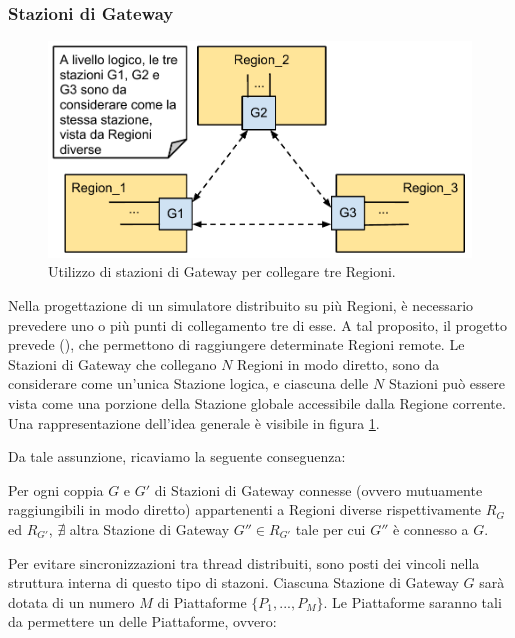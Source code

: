 	
	\subsubsection{Stazioni di Gateway}\label{sec:gateway_stations}
	
	\begin{figure}[htbp]
		\begin{center}
			\includegraphics[width=\textwidth,keepaspectratio]{imgs/gateway_stations.pdf}
			\caption{\footnotesize{Utilizzo di stazioni di Gateway per collegare tre Regioni.}}
			\label{fig:gateway_stations}
		\end{center}
	\end{figure}

	Nella progettazione di un simulatore distribuito su più Regioni, è necessario prevedere uno o più punti di collegamento tre di esse. A tal proposito, il progetto prevede  (), che permettono di raggiungere determinate Regioni remote. Le Stazioni di Gateway che collegano $N$ Regioni in modo diretto, sono da considerare come un'unica Stazione logica, e ciascuna delle $N$ Stazioni può essere vista come una porzione della Stazione globale accessibile dalla Regione corrente. Una rappresentazione dell'idea generale è visibile in figura \ref{fig:gateway_stations}.
	
	Da tale assunzione, ricaviamo la seguente conseguenza:
	\begin{consequence}\label{cons:gateway_unique}
	Per ogni coppia $G$ e $G'$ di Stazioni di Gateway connesse (ovvero mutuamente raggiungibili in modo diretto) appartenenti a Regioni diverse rispettivamente $R_G$ ed $R_{G'}$, $\nexists$ altra Stazione di Gateway $G'' \in R_{G'}$ tale per cui $G''$ è connesso a $G$.
	\end{consequence}

	Per evitare sincronizzazioni tra thread distribuiti, sono posti dei vincoli nella struttura interna di questo tipo di stazoni. Ciascuna Stazione di Gateway $G$ sarà dotata di un numero $M$ di Piattaforme $\{P_1,...,P_M\}$. Le Piattaforme saranno tali da permettere un  delle Piattaforme, ovvero:
		
